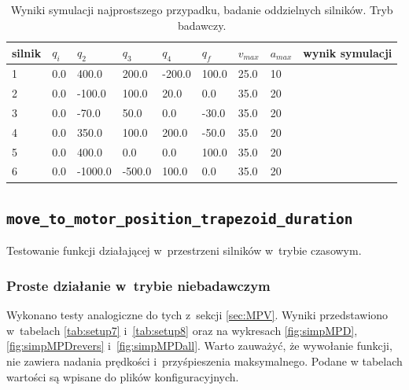 \documentclass[a4paper, 12pt]{article}
\begin{document}
	\begin{table}[H]
	\centering
	\begin{tabular}{|m{2.5em}|m{3em}|m{3.5em}|m{3em}|m{3em}|m{3em}|m{4em}|m{3em}|m{5em}|}
	\hline
	silnik&$ q_i $ & $ q_2 $ & $ q_3 $ & $q_4$ & $ q_f $ & $ v_{max} $ & $ a_{max} $&wynik symulacji\\
	\hline
	\hline
	\hspace{1em}1& 0.0 & 400.0 & 200.0 & -200.0 & 100.0 & 25.0 & 10&\hspace{2em}\checkmark\\ %
	\hline
	\hspace{1em}2& 0.0 & -100.0 & 100.0 & 20.0 & 0.0 & 35.0 & 20&\hspace{2em}\checkmark\\ %
	\hline
	\hspace{1em}3& 0.0 & -70.0 & 50.0 & 0.0 & -30.0 & 35.0 & 20&\hspace{2em}\checkmark\\ %
	\hline
	\hspace{1em}4& 0.0 & 350.0 & 100.0 & 200.0 & -50.0 & 35.0 & 20&\hspace{2em}\checkmark\\  %
	\hline
	\hspace{1em}5& 0.0 & 400.0 & 0.0 & 0.0 & 100.0 & 35.0 & 20&\hspace{2em}\checkmark\\  %
	\hline
	\hspace{1em}6& 0.0 & -1000.0 & -500.0 & 100.0 & 0.0 & 35.0 & 20&\hspace{2em}\checkmark\\  %
	\hline
	\end{tabular}
	\caption{Wyniki symulacji najprostszego przypadku, badanie oddzielnych silników. Tryb badawczy.}
	\label{tab:setup6}
	\end{table}	
	
	\subsection{\texttt{move\_to\_motor\_position\_trapezoid\_duration}}
	Testowanie funkcji działającej w~przestrzeni silników w~trybie czasowym.
	\subsubsection{Proste działanie w~trybie niebadawczym}
	Wykonano testy analogiczne do tych z~sekcji \ref{sec:MPV}. Wyniki przedstawiono w~tabelach \ref{tab:setup7} i~\ref{tab:setup8} oraz  na wykresach \ref{fig:simpMPD}, \ref{fig:simpMPDrevers} i~\ref{fig:simpMPDall}. Warto zauważyć, że wywołanie funkcji, nie zawiera nadania prędkości i~przyśpieszenia maksymalnego. Podane w tabelach wartości są wpisane do plików konfiguracyjnych.
\end{document}

